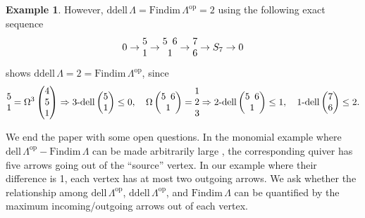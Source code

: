 \documentclass{conm-p-l}
\newcommand{\Findim}{\mathrm{Findim}\,}
\newcommand{\dell}{\mathrm{dell}\,}
\renewcommand{\dell}{\mathrm{dell}\,}
\newcommand{\op}{\mathrm{op}}
\newcommand{\ddell}{\mathrm{ddell}\,}
\theoremstyle{definition}
\newtheorem{example}[theorem]{Example}
\theoremstyle{remark}
\numberwithin{equation}{section}
\begin{document}
\begin{example}
However, $\ddell\Lambda=\Findim\Lambda^{\op}=2$ using the following exact sequence
\[
\begingroup
\setlength\arraycolsep{0pt}
0 \to \begin{matrix} 5 \\ 1 \end{matrix} \to \begin{matrix} 5 & & 6 \\ & 1 & \end{matrix} \to \begin{matrix} 7 \\ 6 \end{matrix} \to S_7 \to 0
\endgroup
\]
shows $\ddell\Lambda=2=\Findim\Lambda^{\op}$, since
\[
\begin{matrix} 5 \\ 1 \end{matrix} = \Omega^3 \left( \begin{matrix} 4 \\ 5 \\ 1 \end{matrix}\right) \Rightarrow 3\text{-}\dell\! \left(\begin{matrix} 5 \\ 1 \end{matrix}\right) \leq 0, \quad \Omega \left(\begingroup
\setlength\arraycolsep{0pt} \begin{matrix} 5 & & 6 \\ & 1 & \end{matrix} \endgroup \right) = \begin{matrix} 1 \\ 2 \\ 3 \end{matrix} \Rightarrow 2\text{-}\dell\! \left(\begingroup
\setlength\arraycolsep{0pt} \begin{matrix} 5 & & 6 \\ & 1 & \end{matrix} \endgroup \right) \leq 1, \quad 1\text{-}\dell\!\left(\begin{matrix} 7 \\ 6 \end{matrix}\right)\leq 2.
\]
\endgroup
\end{example}

We end the paper with some open questions. In the monomial example where $\dell\Lambda^{\op}-\Findim\Lambda$ can be made arbitrarily large \cite{barrios2024delooping}, the corresponding quiver has five arrows going out of the ``source'' vertex. In our example where their difference is 1, each vertex has at most two outgoing arrows. We ask whether the relationship among $\dell\Lambda^{\op}$, $\ddell\Lambda^{\op}$, and $\Findim\Lambda$ can be quantified by the maximum incoming/outgoing arrows out of each vertex.
\end{document}
